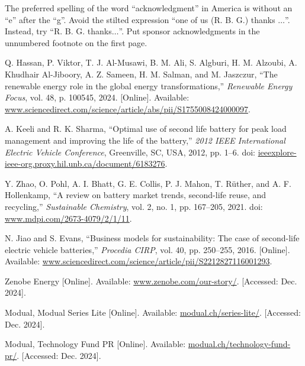 \documentclass[conference]{IEEEtran}
\begin{document}
The preferred spelling of the word ``acknowledgment'' in America is without 
an ``e'' after the ``g''. Avoid the stilted expression ``one of us (R. B. 
G.) thanks $\ldots$''. Instead, try ``R. B. G. thanks$\ldots$''. Put sponsor 
acknowledgments in the unnumbered footnote on the first page.

\begin{thebibliography}{00}
 Q. Hassan, P. Viktor, T. J. Al-Musawi, B. M. Ali, S. Algburi, H. M. Alzoubi, A. Khudhair Al-Jiboory, A. Z. Sameen, H. M. Salman, and M. Jaszczur, ``The renewable energy role in the global energy transformations,'' \textit{Renewable Energy Focus}, vol. 48, p. 100545, 2024. [Online]. Available: \href{https://www.sciencedirect.com/science/article/abs/pii/S1755008424000097?casa_token=bUNZr0M6nogAAAAA:BW6rOq1yhF3iUOtobThX-tDWVjZDpJL9Hzmk0HS78usaDj24Zq_MftqZLBkgYpIrtdgdilaX}{www.sciencedirect.com/science/article/abs/pii/S1755008424000097}.

 A. Keeli and R. K. Sharma, ``Optimal use of second life battery for peak load management and improving the life of the battery,''  \textit{2012 IEEE International Electric Vehicle Conference}, Greenville, SC, USA, 2012, pp. 1--6. doi: \href{https://ieeexplore-ieee-org.proxy.hil.unb.ca/document/6183276}{ieeexplore-ieee-org.proxy.hil.unb.ca/document/6183276}.


 Y. Zhao, O. Pohl, A. I. Bhatt, G. E. Collis, P. J. Mahon, T. Rüther, and A. F. Hollenkamp, ``A review on battery market trends, second-life reuse, and recycling,'' \textit{Sustainable Chemistry}, vol. 2, no. 1, pp. 167--205, 2021. doi: \href{https://www.mdpi.com/2673-4079/2/1/11}{www.mdpi.com/2673-4079/2/1/11}.

 N. Jiao and S. Evans, ``Business models for sustainability: The case of second-life electric vehicle batteries,'' \textit{Procedia CIRP}, vol. 40, pp. 250--255, 2016. [Online]. Available: \href{https://www.sciencedirect.com/science/article/pii/S2212827116001293}{www.sciencedirect.com/science/article/pii/S2212827116001293}.

 Zenobe Energy [Online]. Available: \href{https://www.zenobe.com/our-story/}{www.zenobe.com/our-story/}. [Accessed: Dec. 2024].

 Modual, Modual Series Lite [Online]. Available: \href{https://modual.ch/series-lite/}{modual.ch/series-lite/}. [Accessed: Dec. 2024].

 Modual, Technology Fund PR [Online]. Available: \href{https://modual.ch/technology-fund-pr/}{modual.ch/technology-fund-pr/}. [Accessed: Dec. 2024].


\end{thebibliography}
\end{document}
